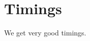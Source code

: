 \documentclass[a4paper,11pt,reqno]{amsart}%
\theoremstyle{definition}
\theoremstyle{plain}
\theoremstyle{remark}
\newcommand\ct[1]{\text{\rmfamily\upshape #1}}
\newcommand{\IntExpX}{\ct{IntExp}_X}
\newcommand{\IntExpY}{\ct{IntExp}_Y}
\begin{document}





%


\section{Timings}

We get very good timings.



\end{document}
